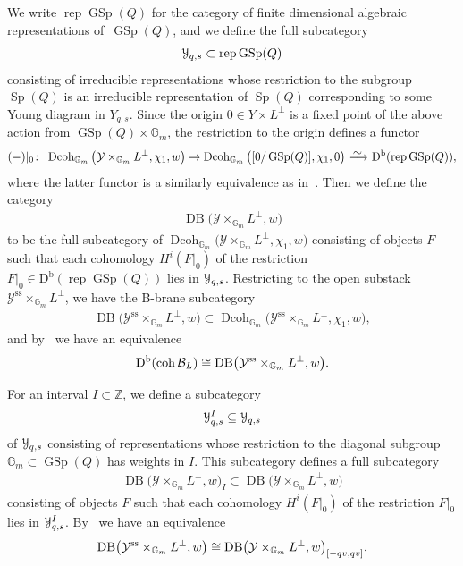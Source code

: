\documentclass[pdftex]{sigma}%
\numberwithin{equation}{section}
\newcommand{\Dcoh}{\operatorname{Dcoh}}
\newcommand{\coh}{\operatorname{coh}}
\newcommand{\Db}{\operatorname{D^b}}
\newcommand{\Sp}{\operatorname{Sp}}
\newcommand{\GSp}{\operatorname{GSp}}
\newcommand{\stab}{\operatorname{ss}}
\newcommand{\DB}{\operatorname{DB}}
\newcommand{\rep}{\operatorname{rep}}
\newcommand{\cB}{\mathcal{B}}
\newcommand{\cY}{\mathcal{Y}}
\newcommand{\bG}{\mathbb{G}}
\newcommand{\bZ}{\mathbb{Z}}
\newcommand{\scrY}{\EuScript{Y}}
\newcommand{\simto}{\,\,\,\,\raisebox{4pt}{$\sim$}{\kern -1.1em \longrightarrow}\,}
\begin{document}
 {\sloppy
 We write $\rep\GSp(Q)$ for the category of finite dimensional algebraic representations of~$\GSp(Q)$, and we define the full subcategory
\begin{gather*}
\scrY_{q,s}\subset \rep\GSp(Q)
\end{gather*}}\noindent
consisting of irreducible representations whose restriction to the subgroup $\Sp(Q)$ is an irreducible representation of $\Sp(Q)$ corresponding to some Young diagram in $Y_{q,s}$.
Since the origin $0\in Y\times L^{\perp}$ is a fixed point of the above action from $\GSp(Q)\times \bG_m$, the restriction to the origin defines a functor
\begin{gather*}
(-)|_0\colon\ \Dcoh_{\bG_m}\big(\cY\times_{\bG_m}L^{\perp},\chi_1,w\big)\to \Dcoh_{\bG_m}\big([0/\GSp(Q)],\chi_1,0\big)\simto\Db(\rep\GSp(Q)),
\end{gather*}
where the latter functor is a similarly equivalence as in~\cite[Proposition~2.14]{H2}.
Then we define the category
\begin{gather*}
\DB\big(\cY\times_{\bG_m}L^{\perp},w\big)
\end{gather*}
 to be the full subcategory of $\Dcoh_{\bG_m}\big(\cY\times_{\bG_m}L^{\perp},\chi_1,w\big)$ consisting of objects $F$ such that each cohomology $H^i(F|_0)$ of the restriction $F|_0\in \Db(\rep\GSp(Q))$ lies in $\scrY_{q,s}$. Restricting to the open substack $\cY^{\stab}\times_{\bG_m}L^{\perp}$, we have the B-brane subcategory
 \begin{gather*}
 \DB\big(\cY^{\stab}\times_{\bG_m}L^{\perp},w\big)\subset \Dcoh_{\bG_m}\big(\cY^{\stab}\times_{\bG_m}L^{\perp},\chi_1,w\big),
 \end{gather*}
 and by~\cite[Section~4.1]{rs} we have an equivalence
\begin{equation}\label{nc br}
\Db(\coh \cB_L)\cong {\rm DB}\big(\cY^{\rm ss}\times_{\bG_m}L^{\perp},w\big).
\end{equation}

For an interval $I\subset \bZ$, we define a subcategory
\begin{gather*}
\scrY_{q,s}^I\subseteq \scrY_{q,s}
\end{gather*}
of $\scrY_{q,s}$ consisting of representations whose restriction to the diagonal subgroup $\bG_m\subset \GSp(Q)$ has weights in $I$. This subcategory defines a full subcategory
\begin{gather*}
\DB\big(\cY\times_{\bG_m}L^{\perp},w\big)_I\subset\DB\big(\cY\times_{\bG_m}L^{\perp},w\big)
\end{gather*}
consisting of objects $F$ such that each cohomology $H^i(F|_0)$ of the restriction $F|_0$ lies in $\scrY_{q,s}^I$.
By~\cite[Theorem~4.7]{rs} we have an equivalence
\begin{equation}\label{window}
{\rm DB}\big(\cY^{\rm ss}\times_{\bG_m}L^{\perp},w\big)\cong {\rm DB}\big(\cY\times_{\bG_m}L^{\perp},w\big)_{[-qv,qv]}.
\end{equation}
\end{document}
